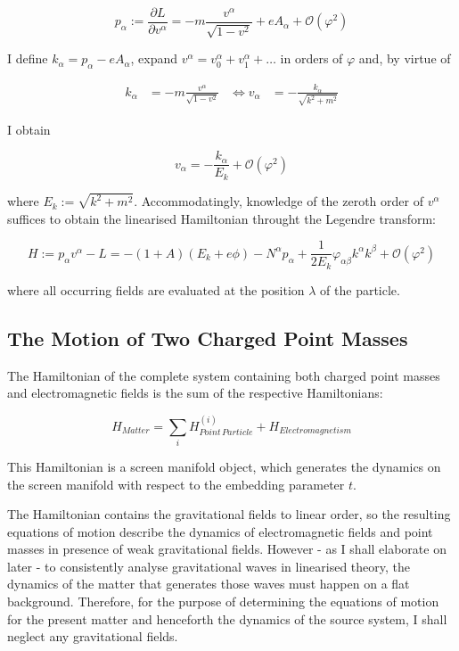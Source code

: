 \documentclass[11pt]{article}
\begin{document}
\begin{equation}
	p_\alpha := \frac{ \partial L}{\partial v^\alpha}
	= -m \frac{v^\alpha}{\sqrt{1- v^2}} + e A_\alpha	 
	+ \mathcal{O} \left(\varphi^2 \right)
\end{equation}

I define $k_\alpha = p_\alpha - e A_\alpha$, expand $v^\alpha = v^\alpha_0 + v^\alpha_1 + \dots $ in orders of $\varphi$ and, by virtue of

\begin{align}
	k_\alpha &= -m \frac{v^\alpha}{\sqrt{1- v^2}} 
	 &\Leftrightarrow 
	 v_\alpha &= - \frac{k_\alpha}{\sqrt{k^2 + m^2}} 
\end{align}

I obtain

\begin{equation}
	v_\alpha = - \frac{k_\alpha}{E_k} + \mathcal{O} \left(\varphi^2 \right)
\end{equation}

where $E_k := \sqrt{k^2+ m^2}$. Accommodatingly, knowledge of the zeroth order of $v^\alpha$ suffices to obtain the linearised Hamiltonian throught the Legendre transform:

\begin{equation}
	H := p_\alpha v^\alpha - L  
	= - \left( 1 + A \right) \left( E_k + e \phi \right)
	- N^\alpha p_\alpha + \frac{1}{2 E_k} \varphi_{\alpha \beta} k^\alpha k^\beta + \mathcal{O} \left(\varphi^2 \right)
\end{equation}

where all occurring fields are evaluated at the position $\lambda$ of the particle.

\subsection{The Motion of Two Charged Point Masses} \label{sec_mot_bin}

The Hamiltonian of the complete system containing both charged point masses and electromagnetic fields is the sum of the respective Hamiltonians:

\begin{equation}
	H_{Matter}  = \sum_i H^{(i)}_{Point \,Particle} + H_{Electromagnetism}
\end{equation}


This Hamiltonian is a screen manifold object, which generates the dynamics on the screen manifold with respect to the embedding parameter $t$.

The Hamiltonian contains the gravitational fields to linear order, so the resulting equations of motion describe the dynamics of electromagnetic fields and point masses in presence of weak gravitational fields. However - as I shall elaborate on later - to consistently analyse gravitational waves in linearised theory, the dynamics of the matter that generates those waves must happen on a flat background. Therefore, for the purpose of determining the equations of motion for the present matter and henceforth the dynamics of the source system, I shall neglect any gravitational fields. 
\end{document}
